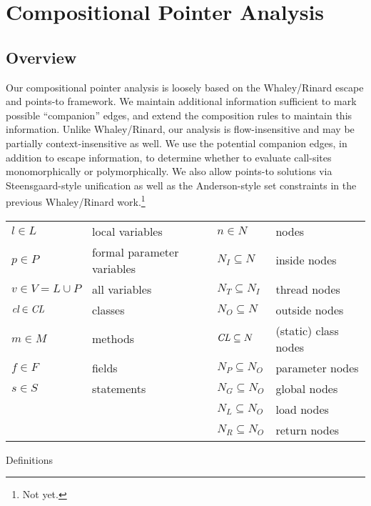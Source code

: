 \documentclass[11pt,notitlepage]{article}
\newcommand{\bigvar}[1]{\ensuremath{\text{\it #1}}}
\begin{document}
\section{Compositional Pointer Analysis}

\subsection{Overview}
Our compositional pointer analysis is loosely based on the Whaley/Rinard
escape and points-to framework.  We maintain additional
information sufficient to mark possible ``companion'' edges, and
extend the composition rules to maintain this information.
Unlike Whaley/Rinard, our analysis is flow-insensitive
and may be partially context-insensitive as well.  
We use the potential companion edges, in addition to escape information,
to determine whether to evaluate call-sites monomorphically or
polymorphically.
We also allow points-to solutions via Steensgaard-style unification as well as
the Anderson-style set constraints in the previous Whaley/Rinard
work.\footnote{Not yet.}

\begin{myfigure}
\begin{tabular}{ll|ll}
$l\in L$ & local variables           &$n\in N$ & nodes\\
$p\in P$ & formal parameter variables&$N_I\subseteq N$ & inside nodes\\
$v\in V=L\cup P$& all variables      &$N_T\subseteq N_I$ & thread nodes\\
$\bigvar{cl}\in \bigvar{CL}$& classes&$N_O\subseteq N$ & outside nodes\\
$m\in M$ & methods                   &$\bigvar{CL}\subseteq N$ 
                                                       & (static) class nodes\\
$f\in F$ & fields                    &$N_P\subseteq N_O$ & parameter nodes\\
$s\in S$ & statements                &$N_G\subseteq N_O$ & global nodes\\
         &                           &$N_L\subseteq N_O$ & load nodes\\
         &                           &$N_R\subseteq N_O$ & return nodes\\
\end{tabular}
\caption{Definitions}
\label{fig:defin}
\end{myfigure}
\end{document}
